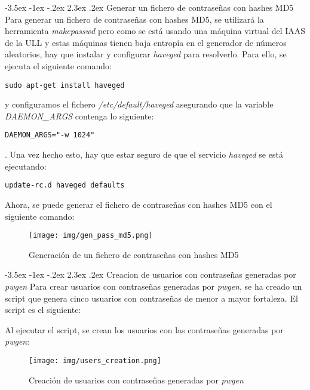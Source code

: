 \documentclass[11pt]{report}
\makeatletter
\renewcommand\chapter{\@startsection{chapter}{0}{\z@}%
    {-3.5ex \@plus -1ex \@minus -.2ex}%
    {2.3ex \@plus.2ex}%
    {\normalfont\Large\bfseries}}
\makeatother
\begin{document}
\chapter{Generar un fichero de contraseñas con hashes MD5}
Para generar un fichero de contraseñas con hashes MD5, se utilizará la herramienta \emph{makepasswd} pero 
como se está usando una máquina virtual del IAAS de la ULL y estas máquinas tienen
baja entropía en el generador de números aleatorios, hay que instalar y configurar \emph{haveged} para
resolverlo. Para ello, se ejecuta el siguiente comando:
\begin{BVerbatim}
sudo apt-get install haveged
\end{BVerbatim}
y configuramos el fichero \emph{/etc/default/haveged} asegurando que la variable \emph{DAEMON\_ARGS} 
contenga lo siguiente:
\begin{BVerbatim}
DAEMON_ARGS="-w 1024"
\end{BVerbatim}
. Una vez hecho esto, hay que estar seguro de que el servicio \emph{haveged} se está ejecutando:
\begin{BVerbatim}
update-rc.d haveged defaults
\end{BVerbatim}

Ahora, se puede generar el fichero de contraseñas con hashes MD5 con el siguiente comando:
\lstset{style=mystyle}


\begin{figure}[H]
  \centering
  \texttt{[image: img/gen\_pass\_md5.png]}
  \caption{Generación de un fichero de contraseñas con hashes MD5}
  \label{fig:generación de un fichero de contraseñas con hashes MD5}
\end{figure}

\cleardoublepage

\chapter{Creacion de usuarios con contraseñas generadas por \emph{pwgen}}
Para crear usuarios con contraseñas generadas por \emph{pwgen}, se ha creado un script que genera
cinco usuarios con contraseñas de menor a mayor fortaleza. El script es el siguiente:
\lstset{style=mystyle}


Al ejecutar el script, se crean los usuarios con las contraseñas generadas por \emph{pwgen}:
\begin{figure}[H]
  \centering
  \texttt{[image: img/users\_creation.png]}
  \caption{Creación de usuarios con contraseñas generadas por \emph{pwgen}}
  \label{fig:creación de usuarios con contraseñas generadas por pwgen}
\end{figure}
\end{document}
